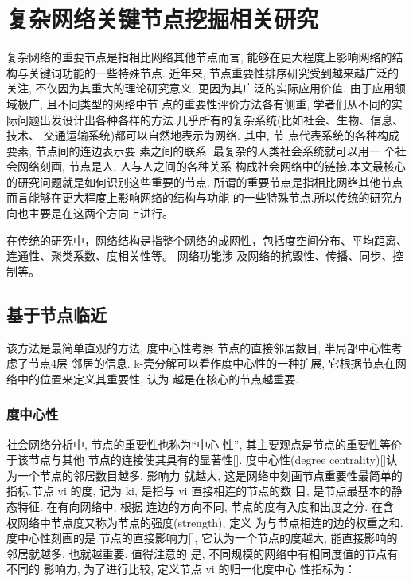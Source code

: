 
\chapter{复杂网络关键节点挖掘相关研究}

复杂网络的重要节点是指相比网络其他节点而言, 能够在更大程度上影响网络的结构与关键词功能的一些特殊节点. 近年来, 节点重要性排序研究受到越来越广泛的关注, 不仅因为其重大的理论研究意义, 更因为其广泛的实际应用价值. 由于应用领域极广, 且不同类型的网络中节 点的重要性评价方法各有侧重, 学者们从不同的实际问题出发设计出各种各样的方法.几乎所有的复杂系统(比如社会、生物、信息、技术、 交通运输系统)都可以自然地表示为网络. 其中, 节 点代表系统的各种构成要素, 节点间的连边表示要 素之间的联系. 最复杂的人类社会系统就可以用一 个社会网络刻画, 节点是人, 人与人之间的各种关系 构成社会网络中的链接.本文最核心的研究问题就是如何识别这些重要的节点. 所谓的重要节点是指相比网络其他节点而言能够在更大程度上影响网络的结构与功能 的一些特殊节点.所以传统的研究方向也主要是在这两个方向上进行。

			在传统的研究中，网络结构是指整个网络的成网性，包括度空间分布、平均距离、连通性、聚类系数、度相关性等。 网络功能涉 及网络的抗毁性、传播、同步、控制等。
			
\section{基于节点临近}
该方法是最简单直观的方法, 度中心性考察 节点的直接邻居数目, 半局部中心性考虑了节点4层 邻居的信息. k-壳分解可以看作度中心性的一种扩展, 它根据节点在网络中的位置来定义其重要性, 认为 越是在核心的节点越重要.
\subsection{度中心性}
社会网络分析中, 节点的重要性也称为“中心 性”, 其主要观点是节点的重要性等价于该节点与其他 节点的连接使其具有的显著性[]. 度中心性(degree centrality)[]认为一个节点的邻居数目越多, 影响力 就越大, 这是网络中刻画节点重要性最简单的指标.节点 vi 的度, 记为 ki, 是指与 vi 直接相连的节点的数 目, 是节点最基本的静态特征. 在有向网络中, 根据 连边的方向不同, 节点的度有入度和出度之分. 在含 权网络中节点度又称为节点的强度(strength), 定义 为与节点相连的边的权重之和. 度中心性刻画的是 节点的直接影响力[], 它认为一个节点的度越大, 能直接影响的邻居就越多, 也就越重要. 值得注意的 是, 不同规模的网络中有相同度值的节点有不同的 影响力, 为了进行比较, 定义节点 vi 的归一化度中心 性指标为：

